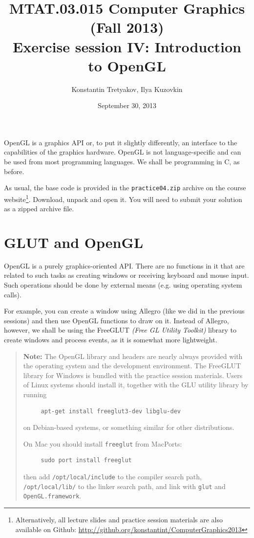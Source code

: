 \documentclass{article}
\begin{document}
\title{MTAT.03.015 Computer Graphics (Fall 2013)\\
Exercise session IV: Introduction to OpenGL}
\author{Konstantin Tretyakov, Ilya Kuzovkin}
\date{September 30, 2013}
\maketitle

OpenGL is a graphics API or, to put it slightly differently, an interface to the capabilities of the graphics hardware. OpenGL is not language-specific and can be used from most programming languages. We shall be programming in C, as before.

As usual, the base code is provided in the \texttt{practice04.zip} archive on the course website\footnote{Alternatively, all lecture slides and practice session materials are also available on Github: \url{http://github.org/konstantint/ComputerGraphics2013}}. Download, unpack and open it. You will need to submit your solution as a zipped archive file.

\section*{GLUT and OpenGL}
OpenGL is a purely graphics-oriented API. There are no functions in it that are related to such tasks as creating windows or receiving keyboard and mouse input. Such operations should be done by external means (e.g. using operating system calls).

For example, you can create a window using Allegro (like we did in the previous sessions) and then use OpenGL functions to draw on it. Instead of Allegro, however, we shall be using the FreeGLUT \emph{(Free GL Utility Toolkit)} library to create windows and process events, as it is somewhat more lightweight.

\begin{verse}
\textbf{Note:} The OpenGL library and headers are nearly always provided with the operating system and the development environment. The FreeGLUT library for Windows is bundled with the practice session materials. Users of Linux systems should install it, together with the GLU utility library by running
\begin{verbatim}
     apt-get install freeglut3-dev libglu-dev
\end{verbatim}
on Debian-based systems, or something similar for other distributions.

\noindent
On Mac you should install \texttt{freeglut} from MacPorts:
\begin{verbatim}
     sudo port install freeglut
\end{verbatim}
then add \texttt{/opt/local/include} to the compiler search path, \texttt{/opt/local/lib/} to the linker search path, and link with \texttt{glut} and \texttt{OpenGL.framework}. 
\end{verse}
\end{document}
